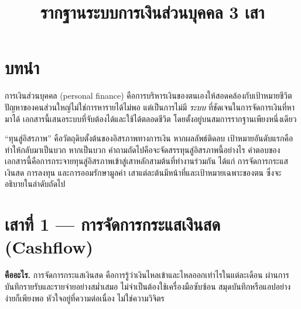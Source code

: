\documentclass[14pt,a4paper,twocolumn]{extarticle}
\title{\vspace{-1.5em}\bfseries\color{accent}\Large รากฐานระบบการเงินส่วนบุคคล 3 เสา}
\author{}
\date{}
\begin{document}

\section{บทนำ}
การเงินส่วนบุคคล (personal finance) คือการบริหารเงินของตนเองให้สอดคล้องกับเป้าหมายชีวิต ปัญหาของคนส่วนใหญ่ไม่ใช่การหารายได้ไม่พอ แต่เป็นการไม่มี \textit{ระบบ} ที่ชัดเจนในการจัดการเงินที่หามาได้ เอกสารนี้เสนอระบบที่จับต้องได้และใช้ได้ตลอดชีวิต โดยตั้งอยู่บนสมการรากฐานเพียงหนึ่งเดียว

\begin{center}
{\setlength{\fboxsep}{10pt}}
\end{center}

“ทุนสู่อิสรภาพ” คือวัตถุดิบตั้งต้นของอิสรภาพทางการเงิน หากผลลัพธ์ติดลบ เป้าหมายอันดับแรกคือทำให้กลับมาเป็นบวก หากเป็นบวก คำถามถัดไปคือจะจัดสรรทุนสู่อิสรภาพนี้อย่างไร คำตอบของเอกสารนี้คือการกระจายทุนสู่อิสรภาพเข้าสู่เสาหลักสามต้นที่ทำงานร่วมกัน ได้แก่ การจัดการกระแสเงินสด การลงทุน และการออมรักษามูลค่า เสาแต่ละต้นมีหน้าที่และเป้าหมายเฉพาะของตน ซึ่งจะอธิบายในลำดับถัดไป

\section{เสาที่ 1 — การจัดการกระแสเงินสด (Cashflow)}
\textbf{คืออะไร.} การจัดการกระแสเงินสด คือการรู้ว่าเงินไหลเข้าและไหลออกเท่าไรในแต่ละเดือน ผ่านการบันทึกรายรับและรายจ่ายอย่างสม่ำเสมอ ไม่จำเป็นต้องใช้เครื่องมือซับซ้อน สมุดบันทึกหรือแอปอย่างง่ายก็เพียงพอ หัวใจอยู่ที่ความต่อเนื่อง ไม่ใช่ความวิจิตร
\end{document}
